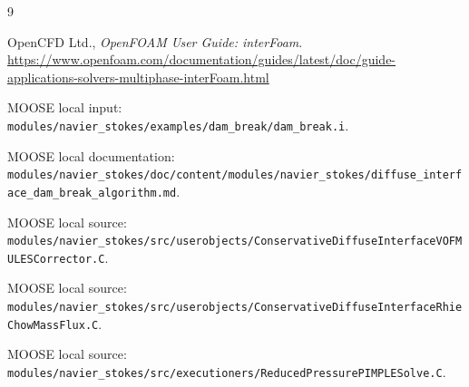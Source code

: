 \documentclass[11pt]{article}
\begin{document}
\begin{thebibliography}{9}

OpenCFD Ltd.,
\emph{OpenFOAM User Guide: interFoam}.
\url{https://www.openfoam.com/documentation/guides/latest/doc/guide-applications-solvers-multiphase-interFoam.html}

MOOSE local input:
\texttt{modules/navier\_stokes/examples/dam\_break/dam\_break.i}.

MOOSE local documentation:
\texttt{modules/navier\_stokes/doc/content/modules/navier\_stokes/diffuse\_interface\_dam\_break\_algorithm.md}.

MOOSE local source:
\texttt{modules/navier\_stokes/src/userobjects/ConservativeDiffuseInterfaceVOFMULESCorrector.C}.

MOOSE local source:
\texttt{modules/navier\_stokes/src/userobjects/ConservativeDiffuseInterfaceRhieChowMassFlux.C}.

MOOSE local source:
\texttt{modules/navier\_stokes/src/executioners/ReducedPressurePIMPLESolve.C}.

\end{thebibliography}
\end{document}
